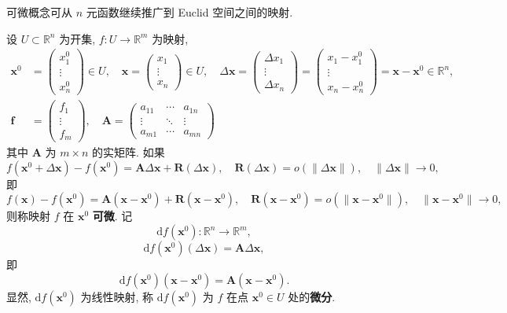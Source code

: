 可微概念可从 $n$ 元函数继续推广到 Euclid 空间之间的映射.

\begin{definition}\label{def:8.2.2}
设 $U \subset \mathbb{R}^{n}$ 为开集, $f: U \to \mathbb{R}^{m}$ 为映射,
\begin{align*}
  \boldsymbol{x}^{0} &= \begin{pmatrix} x_{1}^{0} \\ \vdots \\ x_{n}^{0} \end{pmatrix} \in U, \quad
  \boldsymbol{x} = \begin{pmatrix} x_{1} \\ \vdots \\ x_{n} \end{pmatrix} \in U, \quad
  \Delta\boldsymbol{x} = \begin{pmatrix} \Delta x_{1} \\ \vdots \\ \Delta x_{n} \end{pmatrix}
  = \begin{pmatrix} x_{1} - x_{1}^{0} \\ \vdots \\ x_{n} - x_{n}^{0} \end{pmatrix} = \boldsymbol{x} - \boldsymbol{x}^{0} \in \mathbb{R}^{n}, \\
  \boldsymbol{f} &= \begin{pmatrix} f_{1} \\ \vdots \\ f_{m} \end{pmatrix}, \quad
  \boldsymbol{A} = \begin{pmatrix} a_{11} & \cdots & a_{1n} \\ \vdots & \ddots & \vdots \\ a_{m1} & \cdots & a_{mn} \end{pmatrix}
\end{align*}
其中 $\boldsymbol{A}$ 为 $m \times n$ 的实矩阵. 如果
\[
  f(\boldsymbol{x}^{0} + \Delta\boldsymbol{x}) - f(\boldsymbol{x}^{0}) = \boldsymbol{A}\Delta\boldsymbol{x} + \boldsymbol{R}(\Delta\boldsymbol{x}), \quad \boldsymbol{R}(\Delta\boldsymbol{x}) = o(\|\Delta\boldsymbol{x}\|), \quad \|\Delta\boldsymbol{x}\| \to 0,
\]
即
\[
  f(\boldsymbol{x}) - f(\boldsymbol{x}^{0}) = \boldsymbol{A}(\boldsymbol{x} - \boldsymbol{x}^{0}) + \boldsymbol{R}(\boldsymbol{x} - \boldsymbol{x}^{0}), \quad \boldsymbol{R}(\boldsymbol{x} - \boldsymbol{x}^{0}) = o(\|\boldsymbol{x} - \boldsymbol{x}^{0}\|), \quad \|\boldsymbol{x} - \boldsymbol{x}^{0}\| \to 0,
\]
则称映射 $f$ 在 $\boldsymbol{x}^{0}$ \textbf{可微}. 记
\[
  \mathrm{d}f(\boldsymbol{x}^{0}): \mathbb{R}^{n} \to \mathbb{R}^{m},
\]
\[
  \mathrm{d}f(\boldsymbol{x}^{0})(\Delta\boldsymbol{x}) = \boldsymbol{A}\Delta\boldsymbol{x},
\]
即
\[
  \mathrm{d}f(\boldsymbol{x}^{0})(\boldsymbol{x} - \boldsymbol{x}^{0}) = \boldsymbol{A}(\boldsymbol{x} - \boldsymbol{x}^{0}).
\]
显然, $\mathrm{d}f(\boldsymbol{x}^{0})$ 为线性映射, 称 $\mathrm{d}f(\boldsymbol{x}^{0})$ 为 $f$ 在点 $\boldsymbol{x}^{0} \in U$ 处的\textbf{微分}.
\end{definition}

